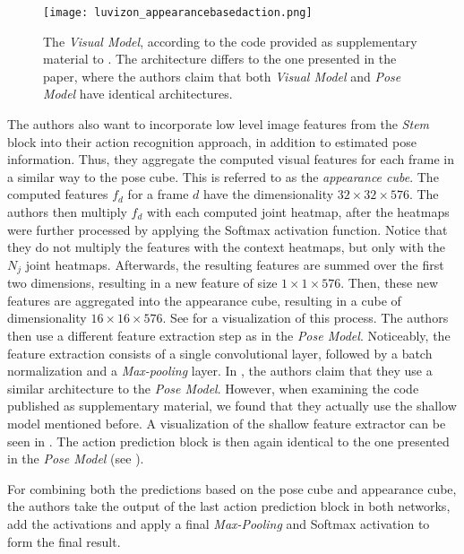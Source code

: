 \begin{figure}[htb!]
    \centering
    \texttt{[image: luvizon\_appearancebasedaction.png]}
    \caption{The \textit{Visual Model}, according to the code provided as supplementary material to \cite{luvizon_2d/3d_2018}. The architecture differs to the one presented in the paper, where the authors claim that both \textit{Visual Model} and \textit{Pose Model} have identical architectures.}
    \label{fig:luvizon_appearancbasedeaction}
\end{figure}

The authors also want to incorporate low level image features from the \textit{Stem} block into their action recognition approach, in addition to estimated pose information.
Thus, they aggregate the computed visual features for each frame in a similar way to the pose cube.
This is referred to as the \textit{appearance cube}.
The computed features $f_d$ for a frame $d$ have the dimensionality $32 \times 32 \times 576$.
The authors then multiply $f_d$ with each computed joint heatmap, after the heatmaps were further processed by applying the Softmax activation function.
Notice that they do not multiply the features with the context heatmaps, but only with the $N_j$ joint heatmaps.
Afterwards, the resulting features are summed over the first two dimensions, resulting in a new feature of size $1 \times 1 \times 576$.
Then, these new features are aggregated into the appearance cube, resulting in a cube of dimensionality $16 \times 16 \times 576$.
See  for a visualization of this process.
The authors then use a different feature extraction step as in the \textit{Pose Model}.
Noticeably, the feature extraction consists of a single convolutional layer, followed by a batch normalization and a \textit{Max-pooling} layer.
In \cite{luvizon_2d/3d_2018}, the authors claim that they use a similar architecture to the \textit{Pose Model}.
However, when examining the code published as supplementary material, we found that they actually use the shallow model mentioned before.
A visualization of the shallow feature extractor can be seen in .
The action prediction block is then again identical to the one presented in the \textit{Pose Model} (see ).

For combining both the predictions based on the pose cube and appearance cube, the authors take the output of the last action prediction block in both networks, add the activations and apply a final \textit{Max-Pooling} and Softmax activation to form the final result. 

